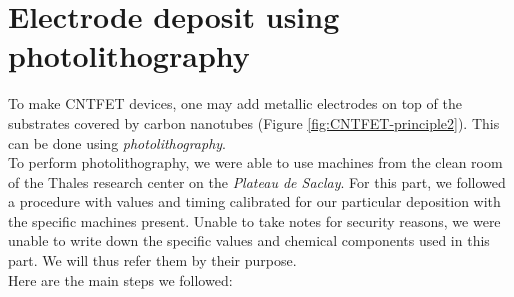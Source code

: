 \documentclass[a4paper,12pt,twoside]{article}
\begin{document}
\section{Electrode deposit using photolithography}
To make CNTFET devices, one may add metallic electrodes on top of the substrates covered by carbon nanotubes (Figure \ref{fig:CNTFET-principle2}). This can be done using \textit{photolithography}.
\\
To perform photolithography, we were able to use machines from the clean room of the Thales research center on the \textit{Plateau de Saclay}. For this part, we followed a procedure with values and timing calibrated for our particular deposition with the specific machines present. Unable to take notes for security reasons, we were unable to write down the specific values and chemical components used in this part. We will thus refer them by their purpose.
\\
Here are the main steps we followed:
\end{document}
